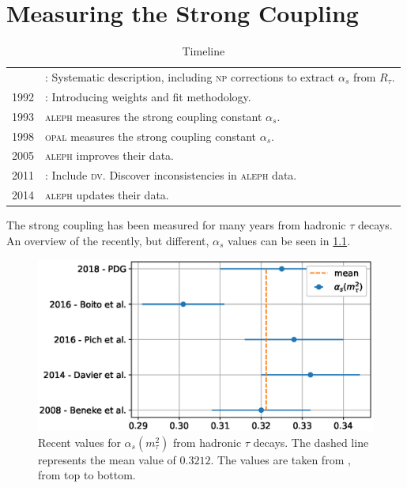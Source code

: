 \documentclass[../../index.tex]{subfiles}
\begin{document}
\chapter{Measuring the Strong Coupling}


\begin{table}
  \vspace{-1cm} \small
  \caption{Timeline}
  \begin{tabular}{@{\,}r <{\hskip 5pt} !{\foo}
      >{\raggedright\arraybackslash}p{5cm}}
    \toprule
     & \cite{Braaten1991}: Systematic description, including \textsc{np} corrections to extract \(\alpha_s\) from \(R_\tau\). \\
    1992 & \cite{LeDiberder1992}: Introducing weights and fit methodology. \\
    1993 & \cite{Aleph1993} \textsc{aleph} measures the strong coupling constant \(\alpha_s\).\\
    1998 & \cite{Opal1998} \textsc{opal} measures the strong coupling constant \(\alpha_s\).\\
    2005 & \cite{Aleph2005} \textsc{aleph} improves their data. \\
    2011 & \cite{Boito2011a,Boito2010}: Include \textsc{dv}. Discover inconsistencies in \textsc{aleph} data. \\
    2014 & \cite{Davier2013} \textsc{aleph} updates their data. \\
  \end{tabular}
  \label{table:AlphasTauTimeline}
\end{table}
The strong coupling has been measured for many years from hadronic \(\tau\)
decays. An overview of the recently, but different, \(\alpha_s\) values can be
seen in \cref{fig:historicAlphasComparison}.
\begin{figure}
  \centering
  \includegraphics[width=\textwidth]{./images/historicAlphasComparison.eps}
  \caption{Recent values for \(\alpha_s(m_\tau^2)\) from hadronic \(\tau\)
    decays. The dashed line represents the mean value of \(0.3212\). The values
    are taken from \cite{PDG2018, Boito2016, Pich2016, Davier2013, Beneke2008},
    from top to bottom.}
  \label{fig:historicAlphasComparison}
\end{figure}
\end{document}
